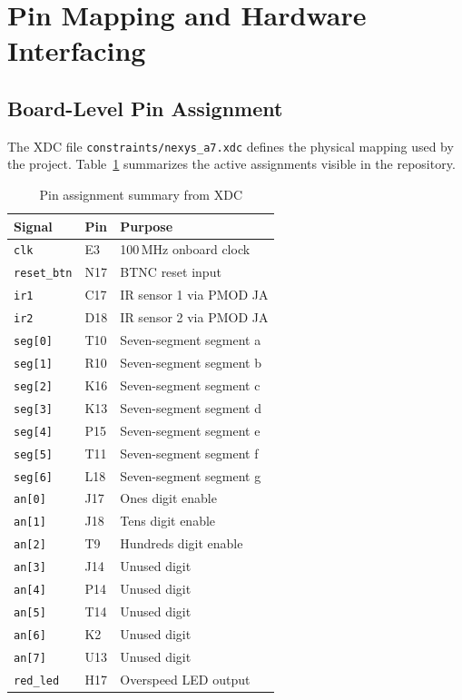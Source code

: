 \documentclass[conference,a4paper]{IEEEtran}
\begin{document}
\section{Pin Mapping and Hardware Interfacing}
\label{sec:pinmap}

\subsection{Board-Level Pin Assignment}
The XDC file \texttt{constraints/nexys\_a7.xdc} defines the physical mapping used by the project. Table~\ref{tab:pinmap} summarizes the active assignments visible in the repository.

\begin{table}[H]
\caption{Pin assignment summary from XDC}
\label{tab:pinmap}
\centering
\begin{tabular}{|p{2.0cm}|p{1.1cm}|p{4.0cm}|}
\hline
\textbf{Signal} & \textbf{Pin} & \textbf{Purpose} \\
\hline
\texttt{clk}       & E3   & 100\,MHz onboard clock \\
\hline
\texttt{reset\_btn} & N17  & BTNC reset input \\
\hline
\texttt{ir1}       & C17  & IR sensor 1 via PMOD JA \\
\hline
\texttt{ir2}       & D18  & IR sensor 2 via PMOD JA \\
\hline
\texttt{seg[0]}    & T10  & Seven-segment segment a \\
\hline
\texttt{seg[1]}    & R10  & Seven-segment segment b \\
\hline
\texttt{seg[2]}    & K16  & Seven-segment segment c \\
\hline
\texttt{seg[3]}    & K13  & Seven-segment segment d \\
\hline
\texttt{seg[4]}    & P15  & Seven-segment segment e \\
\hline
\texttt{seg[5]}    & T11  & Seven-segment segment f \\
\hline
\texttt{seg[6]}    & L18  & Seven-segment segment g \\
\hline
\texttt{an[0]}     & J17  & Ones digit enable \\
\hline
\texttt{an[1]}     & J18  & Tens digit enable \\
\hline
\texttt{an[2]}     & T9   & Hundreds digit enable \\
\hline
\texttt{an[3]}     & J14  & Unused digit \\
\hline
\texttt{an[4]}     & P14  & Unused digit \\
\hline
\texttt{an[5]}     & T14  & Unused digit \\
\hline
\texttt{an[6]}     & K2   & Unused digit \\
\hline
\texttt{an[7]}     & U13  & Unused digit \\
\hline
\texttt{red\_led}  & H17  & Overspeed LED output \\
\hline
\end{tabular}
\end{table}
\end{document}
